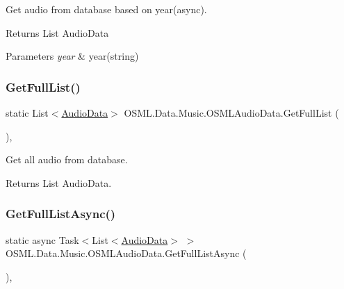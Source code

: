 Get audio from database based on year(async). 

\begin{DoxyReturn}{Returns}
List Audio\+Data 
\end{DoxyReturn}

\begin{DoxyParams}{Parameters}
{\em year} & year(string)\\
\hline
\end{DoxyParams}
\mbox{\label{classOSML_1_1Data_1_1Music_1_1OSMLAudioData_a34edf0c6c48e34a22ee634a35e280c74}} 
\subsubsection{\texorpdfstring{GetFullList()}{GetFullList()}}
{\footnotesize\ttfamily static List$<$\mbox{\hyperlink{classOSML_1_1Media_1_1AudioData}{Audio\+Data}}$>$ O\+S\+M\+L.\+Data.\+Music.\+O\+S\+M\+L\+Audio\+Data.\+Get\+Full\+List (\begin{DoxyParamCaption}{ }\end{DoxyParamCaption})\hspace{0.3cm}{\ttfamily [inline]}, {\ttfamily [static]}}



Get all audio from database. 

\begin{DoxyReturn}{Returns}
List Audio\+Data. 
\end{DoxyReturn}
\mbox{\label{classOSML_1_1Data_1_1Music_1_1OSMLAudioData_a54e9d005b15fbbdc98669b667f11ad44}} 
\subsubsection{\texorpdfstring{GetFullListAsync()}{GetFullListAsync()}}
{\footnotesize\ttfamily static async Task$<$List$<$\mbox{\hyperlink{classOSML_1_1Media_1_1AudioData}{Audio\+Data}}$>$ $>$ O\+S\+M\+L.\+Data.\+Music.\+O\+S\+M\+L\+Audio\+Data.\+Get\+Full\+List\+Async (\begin{DoxyParamCaption}{ }\end{DoxyParamCaption})\hspace{0.3cm}{\ttfamily [inline]}, {\ttfamily [static]}}



